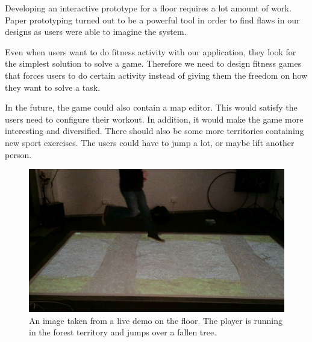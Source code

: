 \documentclass{sigchi}
\begin{document}
  Developing an interactive prototype for a floor requires a lot amount of work. Paper prototyping turned out to be a powerful tool in order to find flaws in our designs as users were able to imagine the system.

  Even when users want to do fitness activity with our application, they look for the simplest solution to solve a game. Therefore we need to design fitness games that forces users to do certain activity instead of giving them the freedom on how they want to solve a task.

  In the future, the game could also contain a map editor. This would satisfy the users need to configure their workout. In addition, it would make the game more interesting and diversified. There should also be some more territories containing new sport exercises. The users could have to jump a lot, or maybe lift another person.

  \newpage

  \begin{figure}[htb]
    \centering
    \includegraphics[width=\linewidth]{Image_22}
    \caption{An image taken from a live demo on the floor. The player is running in the forest territory and jumps over a fallen tree.}
    \label{fig:copy}
  \end{figure}
\end{document}

